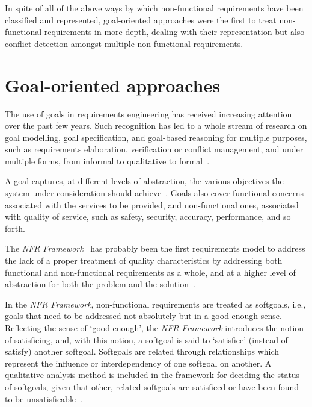 \documentclass[dissertation,final]{softeng}
\newcommand{\nfrs}{non-functional requirements\xspace}
\begin{document}
In spite of all of the above ways by which non-functional requirements have been classified and represented, goal-oriented approaches were the first to treat \nfrs in more depth, dealing with their representation but also conflict detection amongst multiple non-functional requirements. 

\section{Goal-oriented approaches}
The use of goals in requirements engineering has received increasing attention over the past few years. Such recognition has led to a whole stream of research on goal modelling, goal specification, and goal-based reasoning for multiple purposes, such as requirements elaboration, verification or conflict management, and under multiple forms, from informal to qualitative to formal~\citep{Lamsweerde:2001wpba}.

A goal captures, at different levels of abstraction, the various objectives the system under consideration should achieve~\citep{Lamsweerde:2001wpba}. Goals also cover functional concerns associated with the services to be provided, and non-functional ones, associated with quality of service, such as safety, security, accuracy, performance, and so forth.

The \emph{NFR Framework}~\citep{Chung2000} has probably been the first requirements model to address the lack of a proper treatment of quality characteristics by addressing both functional and non-functional requirements as a whole, and at a higher level of abstraction for both the problem and the solution~\citep{Chung:2009vg}.

In the \emph{NFR Framework}, non-functional requirements are treated as softgoals, i.e., goals that need to be addressed not absolutely but in a good enough sense. Reflecting the sense of `good enough', the \emph{NFR Framework} introduces the notion of satisficing, and, with this notion, a softgoal is said to `satisfice' (instead of satisfy) another softgoal. Softgoals are related through relationships which represent the influence or interdependency of one softgoal on another. A qualitative analysis method is included in the framework for deciding the status of softgoals, given that other, related softgoals are satisficed or have been found to be unsatisficable~\citep{Chung2000}.
\end{document}
